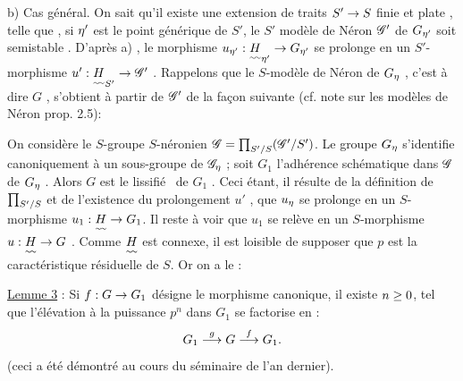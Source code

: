 b) Cas général. On sait qu'il existe une extension de traits $S'\to S$\handwritten{,}
finie et plate , telle que , si $\eta'$ est le point générique de $S'$, le $S'$
modèle de Néron $\mathscr G'$ de $G_{\eta'}$ soit semi\inserted{\handwritten{-}}stable . D'après a) , le morphisme
$u_{\eta'}:\underset{\scriptscriptstyle\sim\!\sim}{H}_{\eta'}\to G_{\eta'}$ se prolonge en un $S'$-morphisme $u':\underset{\scriptscriptstyle\sim\!\sim}{H}_{S'}\to\mathscr G'$ . Rappelons
que le $S$-modèle de Néron de $G_{\eta}$ , c'est à dire $G$ , s'obtient à partir de $\mathscr G'$
de la façon suivante (cf. note sur les modèles de Néron prop. 2.5):

On considère le $S$-groupe $S$-néronien $\mathscr G=\prod_{S'/S}(\mathscr G'/S')$. Le groupe $G_{\eta}$
s'identifie canoniquement à un sous-groupe de $\mathscr G_{\eta}$ ; soit $G_1$ l'adhérence
schématique dans $\mathscr G$ de $G_{\eta}$ . Alors $G$ est le \textquotedbl lissifié \textquotedbl\ de $G_1$ .
Ceci étant, il résulte de la définition de $\prod_{S'/S}$ et de l'existence du
prolongement $u'$ , que $u_{\eta}$ se prolonge en un $S$-morphisme $u_1:\underset{\scriptscriptstyle\sim\!\sim}{H}\to G_1$.
Il reste à voir que $u_1$ se relève en un $S$-morphisme $u:\underset{\scriptscriptstyle\sim\!\sim}{H}\to G$  . Comme $\underset{\scriptscriptstyle\sim\!\sim}{H}$ est connexe, il est loisible de supposer que $p$ est la caractéristique
résiduelle de $S$. Or on a le :

\uline{Lemme 3} : Si $f:G\to G_1$ désigne le morphisme canonique, il existe $n\geq0$,
tel que l'élévation à la puissance $p^n$ dans $G_1$ se factorise en :
\[
G_1\overset{g}{\longrightarrow}G\overset{f}{\longrightarrow}G_1.
\]
(ceci a été démontré au cours du séminaire de l'an dernier).

